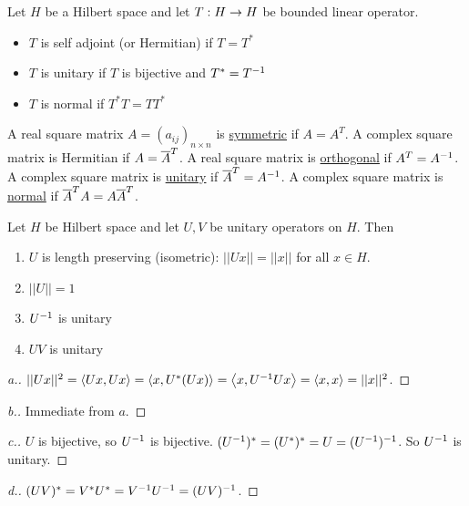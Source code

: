 \documentclass[]{article}
\begin{document}
\begin{definition}
	Let $H$ be a Hilbert space and let $T:H\rightarrow H$ be bounded linear operator.
	\begin{itemize}
		\item $T$ is self adjoint (or Hermitian) if $T=T^*$
		\item $T$ is unitary if $T$ is bijective and $T^*=T^{-1}$
		\item $T$ is normal if $T^*T=TT^*$
	\end{itemize}
\end{definition}

\newpage

\begin{example}
	A real square matrix $A = (a_{ij})_{n\times n}$ is \ul{symmetric} if $A=A^T$.
	A complex square matrix is Hermitian if $A=\overline{A}^T$.
	A real square matrix is \ul{orthogonal} if $A^T=A^{-1}$.
	A complex square matrix is \ul{unitary} if $\overline{A}^T=A^{-1}$.
	A complex square matrix is \ul{normal} if $\overline{A}^TA=A\overline{A}^T$.
\end{example}

\begin{theorem}
	Let $H$ be Hilbert space and let $U,V$ be unitary operators on $H$. Then
	\begin{enumerate}
		\item[a.] $U$ is length preserving (isometric): $||Ux||=||x||$ for all $x\in H$.
		\item[b.] $||U||=1$
		\item[c.] $U^{-1}$ is unitary
		\item[d.] $UV$ is unitary
	\end{enumerate}
\end{theorem}
\begin{proof}
	[a.] 
	$||Ux||^2 = \left\langle Ux,Ux \right\rangle = \left\langle x,U^*(Ux) \right\rangle = \left\langle x,U^{-1} Ux \right\rangle = \left\langle x,x \right\rangle = ||x||^2$.
\end{proof}
\begin{proof}
	[b.] Immediate from $a$.
\end{proof}
\begin{proof}
	[c.]
	$U$ is bijective, so $U^{-1}$ is bijective.
	$ (U^{-1})^* = (U^*)^* = U = (U^{-1})^{-1} $. So $U^{-1}$ is unitary.
\end{proof}
\begin{proof}
	[d.]
	$(UV)^* = V^*U^* = V^{-1} U^{-1} = (UV)^{-1}$.
\end{proof}
\end{document}
